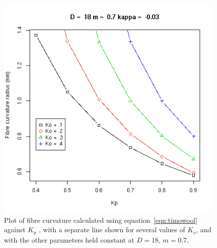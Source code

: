 %

\begin{figure}[!h]
  \centering
  \includegraphics[width=1.0\textwidth]{RvsKpm7.png}
 \caption{Plot of fibre curvature calculated using equation~\ref{eqn:timowool} against $K_{p}$ , with a separate line shown for several values of $K_{o}$, and with the other parameters held constant at $D=18$, $m=0.7$.}
  \label{fig:curvkp40}
\end{figure}

%

